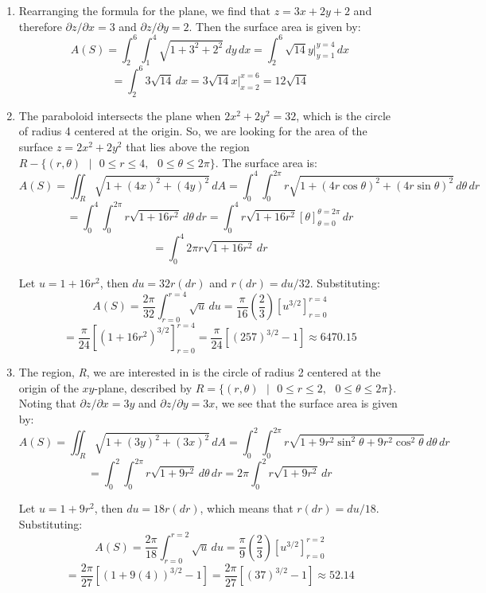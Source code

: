 \begin{Answer}[ref = surface]
\begin{enumerate}
\item Rearranging the formula for the plane, we find that $z = 3x + 2y + 2$ 
and therefore $\partial z / \partial x = 3$ and $\partial z / \partial y = 2$. 
Then the surface area is given by:
$$A(S) = \int_2^6 \int_1^4 \sqrt{1 + 3^2 + 2^2}\,dy\,dx = \int_2^6 \sqrt{14}y|_
{y = 1}^{y = 4}\,dx$$
$$= \int_2^6 3\sqrt{14}\,dx = 3\sqrt{14}x|_{x = 2}^{x = 6} = 12\sqrt{14}$$
\item The paraboloid intersects the plane when $2x^2 + 2y^2 = 32$, which is the
circle of radius 4 centered at the origin. So, we are looking for the area of 
the surface $z = 2x^2 + 2y^2$ that lies above the region $\textit{R} - \{(r, 
\theta)\text{ }|\text{ }0 \leq r \leq 4,\text{ } 0 \leq \theta \leq 2\pi \}$. 
The surface area is:
$$A(S) = \iint_{\textit{R}} \sqrt{1 + \left(4x \right)^2 + \left( 4y \right)^2}
\,dA = \int_0^4 \int_0^{2\pi} r \sqrt{1 + \left(4 r \cos{\theta} \right)^2 + 
\left( 4 r \sin{\theta} \right)^2}\,d\theta\,dr$$
$$= \int_0^4 \int_0^{2\pi} r \sqrt{1 + 16r^2}\,d\theta\,dr = \int_0^4 r \sqrt{
1 + 16r^2} \left[\theta \right]_{\theta = 0}^{\theta = 2\pi}\,dr$$
$$= \int_0^4 2\pi r \sqrt{1 + 16r^2}\,dr$$

Let $u = 1 + 16r^2$, then $du = 32r (dr)$ and $r(dr) = du/32$. Substituting:
$$A(S) = \frac{2\pi}{32} \int_{r = 0}^{r = 4} \sqrt{u}\,du = \frac{\pi}{16} 
\left( \frac{2}{3} \right) \left[u^{3/2} \right]_{r = 0}^{r = 4}$$
$$= \frac{\pi}{24} \left[ \left(1 + 16r^2 \right)^{3/2} \right]_{r = 0}^{r = 4}
= \frac{\pi}{24} \left[ \left(257 \right)^{3/2} - 1\right] \approx 6470.15$$

\item The region, \textit{R}, we are interested in is the circle of radius 2 
centered at the origin of the $xy$-plane, described by $\textit{R} = \{(r, 
\theta)\text{ }|\text{ }0 \leq r \leq 2,\text{ }0 \leq \theta \leq 2\pi \}$. 
Noting that $\partial z / \partial x = 3y$ and $\partial z / \partial y = 3x$, 
we see that the surface area is given by:
$$A(S) = \iint_{\textit{R}} \sqrt{1 + \left(3y \right)^2 + \left( 3x \right)^2}
\,dA = \int_0^2 \int_0^{2\pi} r \sqrt{1 + 9r^2\sin^2{\theta} + 9r^2\cos^2{
\theta}}\,d\theta\,dr$$
$$= \int_0^2 \int_0^{2\pi} r \sqrt{1 + 9r^2}\,d\theta\,dr = 2\pi \int_0^2 r 
\sqrt{1 + 9r^2}\,dr$$

Let $u = 1 + 9r^2$, then $du = 18r(dr)$, which means that $r(dr) = du/18$. 
Substituting:
$$A(S) = \frac{2\pi}{18} \int_{r = 0}^{r = 2} \sqrt{u}\,du = \frac{\pi}{9} 
\left( \frac{2}{3} \right) \left[ u^{3/2} \right]_{r = 0}^{r = 2}$$
$$= \frac{2\pi}{27} \left[ \left(1 + 9(4) \right)^{3/2} - 1 \right] = \frac{2
\pi}{27} \left[ \left(37 \right)^{3/2} - 1 \right] \approx 52.14$$
\end{enumerate}
\end{Answer}

